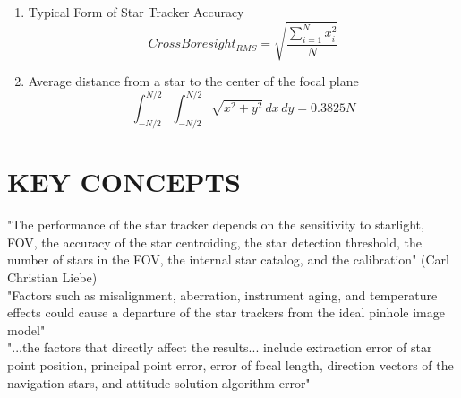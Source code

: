 \begin{enumerate}
    \item Typical Form of Star Tracker Accuracy\cite{accuracy_performance_of_star_trackers}
    \[ CrossBoresight_{RMS} = \sqrt{\frac{\sum_{i=1}^{N} x_{i}^2}{N}} \]

    \item Average distance from a star to the center of the focal plane\cite{accuracy_performance_of_star_trackers} 
    \[ \int_{-N/2}^{N/2}\int_{-N/2}^{N/2} \sqrt{x^2 + y^2} \,dx\,dy = 0.3825N \]

\end{enumerate}

\section{KEY CONCEPTS}

"The performance of the star tracker depends on the sensitivity to starlight, FOV, the accuracy of the star centroiding, the star detection threshold, the number of stars in the FOV, the internal star catalog, and the calibration" (Carl Christian Liebe)\cite{accuracy_performance_of_star_trackers} \\

"Factors such as misalignment, aberration, instrument aging, and temperature effects could cause a departure of the star trackers from the ideal pinhole image model"\cite{optical_system_error_analysis_and_calibration}\\
"...the factors that directly affect the results... include extraction error of star point position, principal point error, error of focal length, direction vectors of the navigation stars, and attitude solution algorithm error" \cite{optical_system_error_analysis_and_calibration} \\

